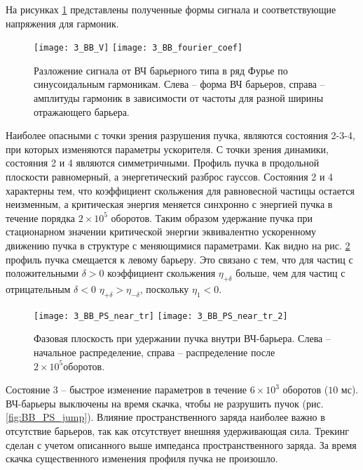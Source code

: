 \noindent На рисунках \ref{fig:wave} представлены полученные формы сигнала и со\-от\-вет\-ству\-ющ\-ие напряжения для гармоник.

\begin{figure}[!h]
   \texttt{[image: 3\_BB\_V]}
   \texttt{[image: 3\_BB\_fourier\_coef]}
   \caption{Разложение сигнала от ВЧ барьерного типа в ряд Фурье по синусоидальным гармоникам. Слева – форма 
   ВЧ барьеров, справа – амплитуды гармоник в зависимости от частоты для разной ширины отражающего барьера.}
   \label{fig:wave}
\end{figure}

\par Наиболее опасными с точки зрения разрушения пучка, являются со\-сто\-я\-ния 2-3-4, при которых изменяются параметры ускорителя. С точки зрения динамики, состояния 2 и 4 являются симметричными. Профиль пучка в продольной плоскости равномерный, а э\-нер\-ге\-ти\-чес\-кий разброс гауссов. Состояния 2 и 4 характерны тем, что коэффициент скольжения для равновесной частицы остается неизменным, а кри\-ти\-чес\-кая энергия меняется синхронно с энергией пучка в течение порядка $2\times{10}^5$ оборотов. Таким образом удержание пучка при стационарном значении критической энергии эквивалентно ускоренному движению пуч\-ка в структуре с меняющимися параметрами. Как видно на рис. \ref{fig:BB_PS_near_tr} профиль пучка смещается к левому барьеру. Это связано с тем, что для частиц с положительными $\delta>0$ коэффициент скольжения $\eta_{+\delta}$ больше, чем для частиц с отрицательным $\delta<0$ $\eta_{+\delta}>\eta_{-\delta}$, поскольку $\eta_1<0$. 

\begin{figure}
   \texttt{[image: 3\_BB\_PS\_near\_tr]}
   \texttt{[image: 3\_BB\_PS\_near\_tr\_2]}
   \caption{Фазовая плоскость при удержании пучка внутри ВЧ-барьера. Слева – начальное распределение, справа – распределение после $2\times{10}^5 оборотов$.}
   \label{fig:BB_PS_near_tr}
\end{figure}

\par Состояние 3 – быстрое изменение параметров в течение $6\times{10}^3$ о\-бо\-ро\-тов ($10$ мс). ВЧ-барьеры выключены на время скачка, чтобы не разрушить пучок (рис. \ref{fig:BB_PS_jump}).  Влияние пространственного заряда наиболее важно в отсутствие барь\-е\-ров, так как отсутствует внешняя удерживающая сила. Трекинг сделан с учетом описанного выше импеданса пространственного заряда. За время скачка существенного изменения профиля пучка не про\-и\-зош\-ло.

